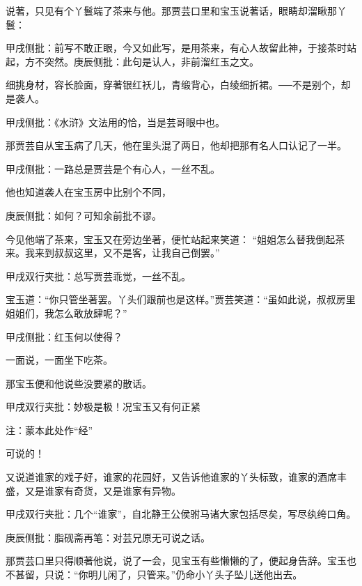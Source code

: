 \begin{parag}


    说著，只见有个丫鬟端了茶来与他。那贾芸口里和宝玉说著话，眼睛却溜瞅那丫鬟：\begin{note}甲戌侧批：前写不敢正眼，今又如此写，是用茶来，有心人故留此神，于接茶时站起，方不突然。庚辰侧批：此句是认人，非前溜红玉之文。\end{note}细挑身材，容长脸面，穿著银红袄儿，青缎背心，白绫细折裙。──不是别个，却是袭人。\begin{note}甲戌侧批：《水浒》文法用的恰，当是芸哥眼中也。\end{note}那贾芸自从宝玉病了几天，他在里头混了两日，他却把那有名人口认记了一半。\begin{note}甲戌侧批：一路总是贾芸是个有心人，一丝不乱。\end{note}他也知道袭人在宝玉房中比别个不同，\begin{note}庚辰侧批：如何？可知余前批不谬。\end{note}今见他端了茶来，宝玉又在旁边坐著，便忙站起来笑道： “姐姐怎么替我倒起茶来。我来到叔叔这里，又不是客，让我自己倒罢。”\begin{note}甲戌双行夹批：总写贾芸乖觉，一丝不乱。\end{note}宝玉道：“你只管坐著罢。丫头们跟前也是这样。”贾芸笑道：“虽如此说，叔叔房里姐姐们，我怎么敢放肆呢？”\begin{note}甲戌侧批：红玉何以使得？\end{note}一面说，一面坐下吃茶。
\end{parag}


\begin{parag}


    那宝玉便和他说些没要紧的散话。\begin{note}甲戌双行夹批：妙极是极！况宝玉又有何正紧\begin{subnote}注：蒙本此处作“经”\end{subnote}可说的！\end{note}又说道谁家的戏子好，谁家的花园好，又告诉他谁家的丫头标致，谁家的酒席丰盛，又是谁家有奇货，又是谁家有异物。\begin{note}甲戌双行夹批：几个“谁家”，自北静王公侯驸马诸大家包括尽矣，写尽纨绔口角。\end{note}\begin{note}庚辰侧批：脂砚斋再笔：对芸兄原无可说之话。\end{note}那贾芸口里只得顺著他说，说了一会，见宝玉有些懒懒的了，便起身告辞。宝玉也不甚留，只说：“你明儿闲了，只管来。”仍命小丫头子坠儿送他出去。
\end{parag}


